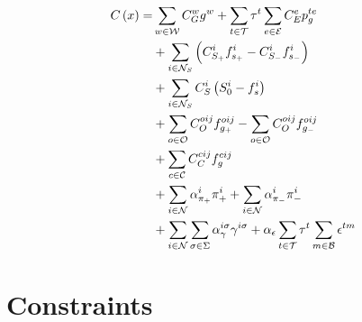 
\begin{equation}
\begin{aligned}
C \left( x \right) = & \sum_{w \in \cal{W}}{C^{w}_{G} g^{w}} + \sum_{t \in \cal{T}} {\tau}^{t}  \sum_{e \in \cal{E}} {C^{e}_{E} p_{g}^{te}}\\ 
				& + \sum_{i \in {\cal{N}}_{S}}{\left({C^{i}_{S_+} f^{i}_{s_+}} - {C^{i}_{S_-} f^{i}_{s_-}}  \right)}\\
				& + \sum_{i \in {\cal{N}}_{S}}{C^{i}_{S} \left( S^{i}_{0} - f^{i}_{s} \right)} \\
				& + \sum_{o \in \cal{O}}{C^{oij}_{O} f^{oij}_{g_+}} - \sum_{o \in \cal{O}}{C^{oij}_{O} f^{oij}_{g_-}} \\
				& + \sum_{c \in \cal{C}}{C^{cij}_{C} f^{cij}_{g}} \\ 
				& + \sum_{i \in \cal{N}}{\alpha^{i}_{\pi_+} \pi^{i}_{+}} + \sum_{i \in \cal{N}}{ \alpha^{i}_{\pi_-} \pi^{i}_{-}} \\
				& + \sum_{i \in \cal{N}}\sum_{\sigma \in \Sigma} {\alpha_{\gamma}^{i \sigma}\gamma^{i \sigma}} + \alpha_{\epsilon} \sum_{t \in \cal{T}} {\tau}^{t} \sum_{m \in \cal{B}} {\epsilon^{tm}}  
\end{aligned}
\label{eq:obj_func}
\end{equation}

\section{Constraints}


